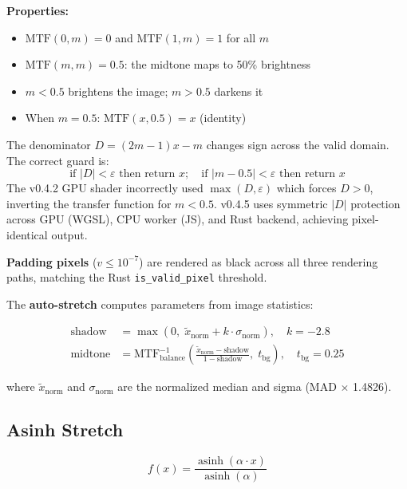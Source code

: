 \documentclass[11pt,a4paper]{article}
\newcommand{\code}[1]{\texttt{\small #1}}
\begin{document}
    \textbf{Properties:}
    \begin{itemize}[nosep]
    \item $\text{MTF}(0, m) = 0$ and $\text{MTF}(1, m) = 1$ for all $m$
    \item $\text{MTF}(m, m) = 0.5$: the midtone maps to 50\% brightness
    \item $m < 0.5$ brightens the image; $m > 0.5$ darkens it
    \item When $m = 0.5$: $\text{MTF}(x, 0.5) = x$ (identity)
    \end{itemize}

    \begin{notebox}
        The denominator $D = (2m - 1)x - m$ changes sign across the valid domain. The correct guard is:
        \[
            \text{if } |D| < \varepsilon \text{ then return } x; \quad \text{if } |m - 0.5| < \varepsilon \text{ then return } x
        \]
        The v0.4.2 GPU shader incorrectly used $\max(D, \varepsilon)$ which forces $D > 0$, inverting the transfer function for $m < 0.5$. v0.4.5 uses symmetric $|D|$ protection across GPU (WGSL), CPU worker (JS), and Rust backend, achieving pixel-identical output.
    \end{notebox}

    \textbf{Padding pixels} ($v \leq 10^{-7}$) are rendered as black across all three rendering paths, matching the Rust \code{is\_valid\_pixel} threshold.

    The \textbf{auto-stretch} computes parameters from image statistics:

    \begin{align}
        \text{shadow} &= \max\left(0,\; \tilde{x}_{\text{norm}} + k \cdot \sigma_{\text{norm}}\right), \quad k = -2.8 \label{eq:shadow} \\[6pt]
        \text{midtone} &= \text{MTF}_{\text{balance}}^{-1}\left(\frac{\tilde{x}_{\text{norm}} - \text{shadow}}{1 - \text{shadow}},\; t_{\text{bg}}\right), \quad t_{\text{bg}} = 0.25 \label{eq:midtone}
    \end{align}

    where $\tilde{x}_{\text{norm}}$ and $\sigma_{\text{norm}}$ are the normalized median and sigma (MAD $\times$ 1.4826).

    \subsection{Asinh Stretch}

    \begin{equation}
        \boxed{
            f(x) = \frac{\operatorname{asinh}(\alpha \cdot x)}{\operatorname{asinh}(\alpha)}
        }
        \label{eq:asinh}
    \end{equation}
\end{document}
